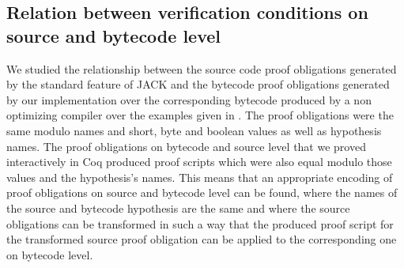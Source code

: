 
 \subsection{Relation between verification conditions on source and bytecode level }  \label{pogEquiv}

 We studied the relationship between the source code proof obligations generated 
 by the standard feature of JACK and the bytecode proof obligations generated by our implementation over the corresponding bytecode
 produced by a non optimizing compiler over the examples given in \cite{JPVC03JKM}. The proof obligations were the same modulo names and
short, byte and boolean values as well as hypothesis names. The proof obligations on bytecode and source level
that we proved interactively in Coq produced proof scripts which were also equal modulo those values and
 the hypothesis's names. This means that an
 appropriate encoding of proof obligations on source and bytecode level can be found, where the names of the source and bytecode hypothesis are the same and where the source obligations can be transformed in such a way that
 the produced proof script for the transformed source proof obligation can be applied to the corresponding one on bytecode level. 



 


